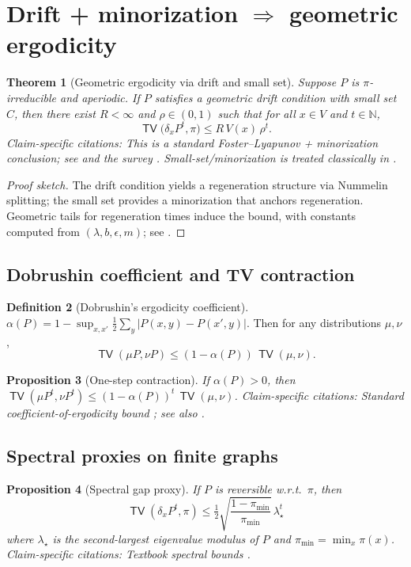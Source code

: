 \documentclass[11pt]{article}
\theoremstyle{plain}
\newtheorem{theorem}{Theorem}[section]
\newtheorem{proposition}[theorem]{Proposition}
\theoremstyle{definition}
\newtheorem{definition}[theorem]{Definition}
\theoremstyle{remark}
\DeclareMathOperator{\TV}{\mathsf{TV}}
\newcommand{\NN}{\mathbb{N}}
\newcommand{\1}{\mathds{1}}
\begin{document}
\section{Drift + minorization $\Rightarrow$ geometric ergodicity}
\begin{theorem}[Geometric ergodicity via drift and small set]\label{thm:drift_minorization_geometric}
Suppose $P$ is $\pi$-irreducible and aperiodic. If $P$ satisfies a geometric drift condition with small set $C$, then there exist $R<\infty$ and $\rho\in(0,1)$ such that for all $x\in V$ and $t\in\NN$,
\[
\TV\!\big(\delta_x P^t,\pi\big)\le R\,V(x)\,\rho^t.
\]
\textit{Claim-specific citations:} This is a standard Foster--Lyapunov + minorization conclusion; see \cite[Thm.~15.0.1]{MeynTweedie2009} and the survey \cite[Sec.~2]{RobertsRosenthal2004}. Small-set/minorization is treated classically in \cite{Nummelin1984}.
\end{theorem}

\begin{proof}[Proof sketch]
The drift condition yields a regeneration structure via Nummelin splitting; the small set provides a minorization that anchors regeneration. Geometric tails for regeneration times induce the bound, with constants computed from $(\lambda,b,\epsilon,m)$; see \cite{MeynTweedie2009,Nummelin1984,RobertsRosenthal2004}.
\end{proof}

\subsection{Dobrushin coefficient and TV contraction}
\begin{definition}[Dobrushin’s ergodicity coefficient]
$\alpha(P)=1-\sup_{x,x'}\tfrac12\sum_y|P(x,y)-P(x',y)|$. Then for any distributions $\mu,\nu$,
\[
\TV(\mu P,\nu P)\le (1-\alpha(P))\,\TV(\mu,\nu).
\]
\end{definition}

\begin{proposition}[One-step contraction]\label{prop:dobrushin}
If $\alpha(P)>0$, then $\TV(\mu P^t,\nu P^t)\le (1-\alpha(P))^t \,\TV(\mu,\nu)$.
\textit{Claim-specific citations:} Standard coefficient-of-ergodicity bound \cite[Ch.~4]{Seneta2006}; see also \cite[Ch.~4]{LevinPeresWilmer2009}.
\end{proposition}

\subsection{Spectral proxies on finite graphs}
\begin{proposition}[Spectral gap proxy]\label{prop:spectral}
If $P$ is reversible w.r.t.\ $\pi$, then
\[
\TV(\delta_x P^t,\pi)\le \tfrac12 \sqrt{\frac{1-\pi_{\min}}{\pi_{\min}}}\,\lambda_\star^t
\]
where $\lambda_\star$ is the second-largest eigenvalue modulus of $P$ and $\pi_{\min}=\min_x\pi(x)$.
\textit{Claim-specific citations:} Textbook spectral bounds \cite[Ch.~12]{LevinPeresWilmer2009}.
\end{proposition}
\end{document}
